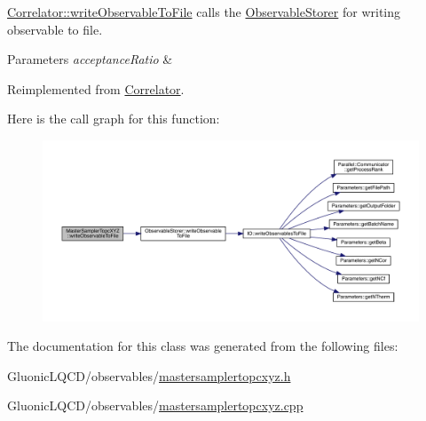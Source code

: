 \mbox{\hyperlink{class_correlator_a9e8d80e30e4fbe3b7fe57521538cb5ff}{Correlator\+::write\+Observable\+To\+File}} calls the \mbox{\hyperlink{class_observable_storer}{Observable\+Storer}} for writing observable to file. 


\begin{DoxyParams}{Parameters}
{\em acceptance\+Ratio} & \\
\hline
\end{DoxyParams}


Reimplemented from \mbox{\hyperlink{class_correlator_a9e8d80e30e4fbe3b7fe57521538cb5ff}{Correlator}}.

Here is the call graph for this function\+:\nopagebreak
\begin{figure}[H]
\begin{center}
\leavevmode
\includegraphics[width=350pt]{class_master_sampler_topc_x_y_z_a930f13a2a13f4b3820f40c8b52110cf2_cgraph}
\end{center}
\end{figure}


The documentation for this class was generated from the following files\+:\begin{DoxyCompactItemize}
\item 
Gluonic\+L\+Q\+C\+D/observables/\mbox{\hyperlink{mastersamplertopcxyz_8h}{mastersamplertopcxyz.\+h}}\item 
Gluonic\+L\+Q\+C\+D/observables/\mbox{\hyperlink{mastersamplertopcxyz_8cpp}{mastersamplertopcxyz.\+cpp}}\end{DoxyCompactItemize}
